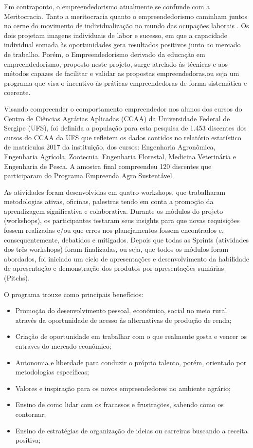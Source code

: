 Em contraponto, o empreendedorismo atualmente se confunde com a Meritocracia. Tanto a meritocracia quanto o empreendedorismo caminham juntos no cerne do movimento de individualização no mundo das ocupações laborais \cite{costa_novo_2019}. Os dois projetam imagens individuais de labor e sucesso, em que a capacidade individual somada às oportunidades gera resultados positivos junto ao mercado de trabalho. Porém, o Empreendedorismo derivado da educação em empreendedorismo, proposto neste projeto, surge atrelado às técnicas e aos métodos capazes de facilitar e validar as propostas empreendedoras,ou seja um programa que visa o incentivo às práticas empreendedoras de forma sistemática e coerente.

Visando compreender o comportamento empreendedor nos alunos dos cursos do Centro de Ciências Agrárias Aplicadas (CCAA) da Universidade Federal de Sergipe (UFS), foi definida a população para esta pesquisa de 1.453 discentes dos cursos do CCAA da UFS que refletem os dados contidos no relatório estatístico de matrículas 2017 da instituição, dos cursos: Engenharia Agronômica, Engenharia Agrícola, Zootecnia, Engenharia Florestal, Medicina Veterinária e Engenharia de Pesca. A amostra final compreendeu 120 discentes que participaram do Programa Empreenda Agro Sustentável.

As atividades foram desenvolvidas em quatro workshops, que trabalharam metodologias ativas, oficinas, palestras tendo em conta a promoção da aprendizagem significativa e colaborativa. Durante os módulos do projeto (workshops), os participantes testaram seus insights para que novas requisições fossem realizadas e/ou que erros nos planejamentos fossem encontrados e, consequentemente, debatidos e mitigados. Depois que todas as Sprints (atividades dos três workshops) foram finalizadas, ou seja, que todos os módulos foram abordados, foi iniciado um ciclo de apresentações e desenvolvimento da habilidade de apresentação e demonstração dos produtos por apresentações sumárias (Pitchs). 

O programa trouxe como principais benefícios: 

\begin{itemize}
\item{Promoção do desenvolvimento pessoal, econômico, social no meio rural através da oportunidade de acesso às alternativas de produção de renda;}
\item{Criação de oportunidade em trabalhar com o que realmente gosta e vencer os entraves do mercado econômico;}
\item{Autonomia e liberdade para conduzir o próprio talento, porém, orientado por metodologias específicas;}
\item{Valores e inspiração para os novos empreendedores no ambiente agrário;}
\item{Ensino de como lidar com os fracassos e frustrações, sabendo como os contornar;}
\item{Ensino de estratégias de organização de ideias ou carreiras buscando a receita positiva;}
\end{itemize}




